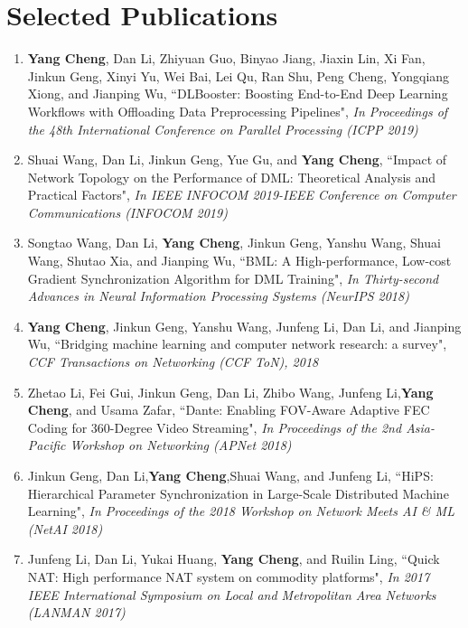 \documentclass{resume}
\newcommand{\authorlist}[1]{{\textcolor[rgb]{0,0,0}{#1}}}
\newcommand{\papertitle}[1]{{``#1"}}
\newcommand{\publicationaddr}[1]{{\textit{#1}}}
\begin{document}
\section{Selected Publications}

\begin{enumerate}
	\item \authorlist{\textbf{Yang Cheng}, Dan Li, Zhiyuan Guo, Binyao Jiang, Jiaxin Lin, Xi Fan, Jinkun Geng, Xinyi Yu, Wei Bai, Lei Qu, Ran Shu, Peng Cheng, Yongqiang Xiong, and Jianping Wu}, \papertitle{DLBooster: Boosting End-to-End Deep Learning Workflows with Offloading Data Preprocessing Pipelines}, \publicationaddr{In Proceedings of the 48th International Conference on Parallel Processing (ICPP 2019)}
	\item \authorlist{Shuai Wang, Dan Li, Jinkun Geng, Yue Gu, and \textbf{Yang Cheng}}, \papertitle{Impact of Network Topology on the Performance of DML: Theoretical Analysis and Practical Factors}, \publicationaddr{In IEEE INFOCOM 2019-IEEE Conference on Computer Communications (INFOCOM 2019)}
	\item \authorlist{Songtao Wang, Dan Li, \textbf{Yang Cheng}, Jinkun Geng, Yanshu Wang, Shuai Wang, Shutao Xia, and Jianping Wu}, \papertitle{BML: A High-performance, Low-cost Gradient Synchronization Algorithm for DML Training}, \publicationaddr{In Thirty-second Advances in Neural Information Processing Systems (NeurIPS 2018)}
	\item \authorlist{\textbf{Yang Cheng}, Jinkun Geng, Yanshu Wang, Junfeng Li, Dan Li, and Jianping Wu}, \papertitle{Bridging machine learning and computer network research: a survey}, \publicationaddr{CCF Transactions on Networking (CCF ToN), 2018}
	\item \authorlist{Zhetao Li, Fei Gui, Jinkun Geng, Dan Li, Zhibo Wang, Junfeng Li,\textbf{Yang Cheng}, and Usama Zafar}, \papertitle{Dante: Enabling FOV-Aware Adaptive FEC Coding for 360-Degree Video Streaming}, \publicationaddr{In Proceedings of the 2nd Asia-Pacific Workshop on Networking  (APNet 2018)}
	\item \authorlist{Jinkun Geng, Dan Li,\textbf{Yang Cheng},Shuai Wang, and Junfeng Li}, \papertitle{HiPS: Hierarchical Parameter Synchronization in Large-Scale Distributed Machine Learning}, \publicationaddr{In Proceedings of the 2018 Workshop on Network Meets AI \& ML (NetAI 2018)}
	\item \authorlist{Junfeng Li, Dan Li, Yukai Huang, \textbf{Yang Cheng}, and Ruilin Ling}, \papertitle{Quick NAT: High performance NAT system on commodity platforms}, \publicationaddr{In 2017 IEEE International Symposium on Local and Metropolitan Area Networks (LANMAN 2017)}
\end{enumerate}
\end{document}
